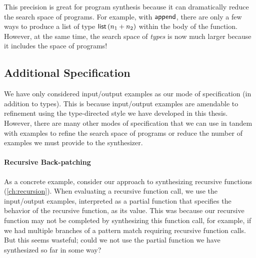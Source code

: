 \begin{description}
    This precision is great for program synthesis because it can dramatically reduce the search space of programs.
    For example, with $\mathsf{append}$, there are only a few ways to produce a list of type $\mathsf{list}\,(n_1 + n_2)$ within the body of the function.
    However, at the same time, the search space of \emph{types} is now much larger because it includes the space of programs!
\end{description}

\subsection{Additional Specification}
\label{subsec:additional-specification}

We have only considered input/output examples as our mode of specification (in addition to types).
This is because input/output examples are amendable to refinement using the type-directed style we have developed in this thesis.
However, there are many other modes of specification that we can use in tandem with examples to refine the search space of programs or reduce the number of examples we must provide to the synthesizer.

\paragraph{Recursive Back-patching}
As a concrete example, consider our approach to synthesizing recursive functions (\autoref{ch:recursion}).
When evaluating a recursive function call, we use the input/output examples, interpreted as a partial function that specifies the behavior of the recursive function, as its value.
This was because our recursive function may not be completed by synthesizing this function call, for example, if we had multiple branches of a pattern match requiring recursive function calls.
But this seems wasteful; could we not use the partial function we have synthesized so far in some way?

